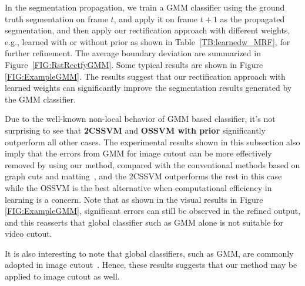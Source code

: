 \documentclass[10pt,journal,compsoc]{newIEEEtran}
\begin{document}
In the segmentation propagation, we train a GMM classifier using the ground truth segmentation on frame $t$, and apply it on frame $t+1$ as the propagated segmentation, and then apply our rectification approach with different weights, e.g., learned with or without prior as shown in Table~\ref{TB:learnedw_MRF}, for further refinement. The average boundary deviation are summarized in Figure~\ref{FIG:RstRectfyGMM}. Some typical results are shown in Figure \ref{FIG:ExampleGMM}. The results suggest that our rectification approach with learned weights can significantly improve the segmentation results generated by the GMM classifier.

Due to the well-known non-local behavior of GMM based classifier, it's not surprising to see that \textbf{2CSSVM} and \textbf{OSSVM with prior} significantly outperform all other cases. The experimental results shown in this subsection also imply that the errors from GMM for image cutout can be more effectively removed by using our method, compared with the conventional methods based on graph cuts and matting~\cite{Rother04GrabCut,BoykovJolly01GMM-MRF}, and the 2CSSVM outperforms the rest in this case while the OSSVM is the best alternative when computational efficiency in learning is a concern. Note that as shown in the visual results in Figure \ref{FIG:ExampleGMM}, significant errors can still be observed in the refined output, and this reasserts that global classifier such as GMM alone is not suitable for video cutout.
\iffalse\begin{figure}[!h]
	\centering
	\texttt{[image: imgs/plots/GMM\_plot.jpg]}\\
	\caption{Effectiveness of our data-driven video cutout rectification on GMM classifier.}\label{FIG:RstRectfyGMM}
\end{figure}\fi

It is also interesting to note that global classifiers, such as GMM, are commonly adopted in image cutout~\cite{Rother04GrabCut,BoykovJolly01GMM-MRF}. Hence, these results suggests that our method may be applied to image cutout as well.
\end{document}
